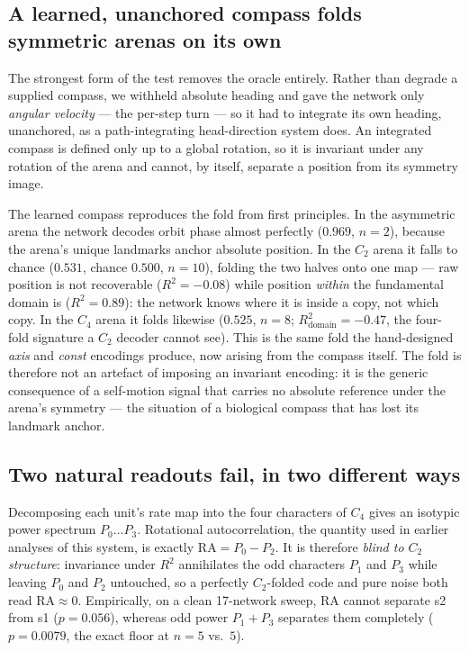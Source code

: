 \documentclass[9pt,lineno]{elife}
\begin{document}
\subsection{A learned, unanchored compass folds symmetric arenas on its own}

The strongest form of the test removes the oracle entirely. Rather than degrade a supplied
compass, we withheld absolute heading and gave the network only \emph{angular velocity} --- the
per-step turn --- so it had to integrate its own heading, unanchored, as a path-integrating
head-direction system does. An integrated compass is defined only up to a global rotation, so it
is invariant under any rotation of the arena and cannot, by itself, separate a position from its
symmetry image.

The learned compass reproduces the fold from first principles. In the asymmetric arena the
network decodes orbit phase almost perfectly ($0.969$, $n=2$), because the arena's unique
landmarks anchor absolute position. In the $C_2$ arena it falls to chance ($0.531$, chance
$0.500$, $n=10$), folding the two halves onto one map --- raw position is not recoverable
($R^2 = -0.08$) while position \emph{within} the fundamental domain is ($R^2 = 0.89$): the
network knows where it is inside a copy, not which copy. In the $C_4$ arena it folds likewise
($0.525$, $n=8$; $R^2_{\text{domain}} = -0.47$, the four-fold signature a $C_2$ decoder cannot
see). This is the same fold the hand-designed \textit{axis} and \textit{const} encodings produce,
now arising from the compass itself. The fold is therefore not an artefact of imposing an
invariant encoding: it is the generic consequence of a self-motion signal that carries no
absolute reference under the arena's symmetry --- the situation of a biological compass that has
lost its landmark anchor.

\subsection{Two natural readouts fail, in two different ways}

Decomposing each unit's rate map into the four characters of $C_4$ gives an isotypic power
spectrum $P_0 \dots P_3$. Rotational autocorrelation, the quantity used in earlier analyses of
this system, is exactly $\mathrm{RA} = P_0 - P_2$. It is therefore \emph{blind to $C_2$
structure}: invariance under $R^2$ annihilates the odd characters $P_1$ and $P_3$ while leaving
$P_0$ and $P_2$ untouched, so a perfectly $C_2$-folded code and pure noise both read
$\mathrm{RA}\approx0$. Empirically, on a clean 17-network sweep, RA cannot separate s2 from s1
($p = 0.056$), whereas odd power $P_1 + P_3$ separates them completely ($p = 0.0079$, the exact
floor at $n=5$ vs.\ $5$).
\end{document}
